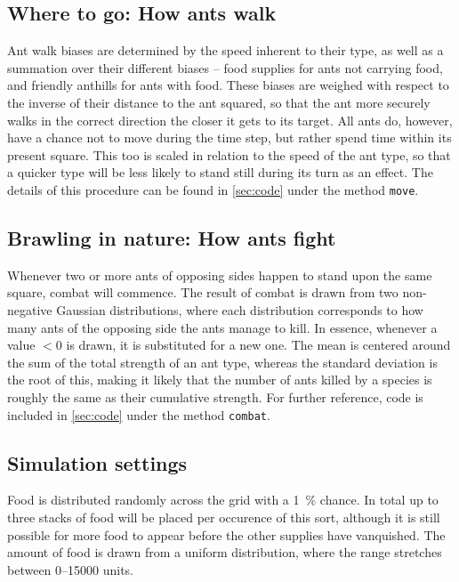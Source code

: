\documentclass[a4paper,12pt]{article}
\theoremstyle{plain}
\theoremstyle{definition}
\begin{document}
   \subsection{Where to go: How ants walk}
      Ant walk biases are determined by the speed inherent to their type, as well
      as a summation over their different biases -- food supplies for ants not 
      carrying food, and friendly anthills for ants with food. These biases are
      weighed with respect to the inverse of their distance to the ant squared,
      so that the ant more securely walks in the correct direction the closer it
      gets to its target. All ants do, however, have a chance not to move during
      the time step, but rather spend time within its present square. This too
      is scaled in relation to the speed of the ant type, so that a quicker type
      will be less likely to stand still during its turn as an effect. The
      details of this procedure can be found in \cref{sec:code} under the method
      \texttt{move}.

   \subsection{Brawling in nature: How ants fight}
      Whenever two or more ants of opposing sides happen to stand upon the same
      square, combat will commence. The result of combat is drawn from two
      non-negative Gaussian distributions, where each distribution corresponds
      to how many ants of the opposing side the ants manage to kill. In essence,
      whenever a value $<0$ is drawn, it is substituted for a new one. The mean
      is centered around the sum of the total strength of an ant type, whereas
      the standard deviation is the root of this, making it likely that
      the number of ants killed by a species is roughly the same as their
      cumulative strength. For further reference, code is included in
      \cref{sec:code} under the method \texttt{combat}.
   
   \subsection{Simulation settings}
      Food is distributed randomly across the grid with a 1~\% chance. In total
      up to three stacks of food will be placed per occurence of this sort, although
      it is still possible for more food to appear before the other supplies
      have vanquished. The amount of food is drawn from a uniform distribution,
      where the range stretches between 0--15000 units. 
\end{document}

